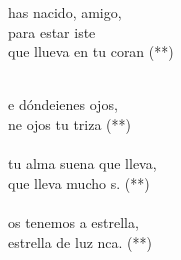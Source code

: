 \begin{cancion}%
	\begin{chorus}%
	has nacido, amigo,\\
	para estar iste\\
	que llueva en tu coran (**)\\
	\end{chorus}%
	\jump\\
	e dóndeienes ojos,\\
	ne ojos tu triza (**)\\
\jump\\
	tu alma suena  que lleva,\\
	que lleva mucho s. (**)\\
\jump\\
	os tenemos a estrella,\\
	 estrella de luz nca. (**)\\
\end{cancion}%
